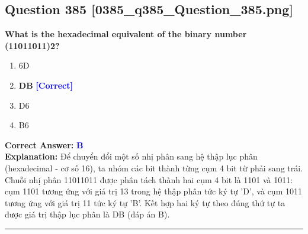 \documentclass[11pt,a4paper]{article}
\begin{document}
\begin{minipage}{\textwidth}
\subsection*{Question 385 \quad \footnotesize{[0385\_q385\_Question\_385.png]}}
\noindent \textbf{What is the hexadecimal equivalent of the binary number (11011011)2?}

\begin{enumerate}[label=\Alph*.]
    \item 6D
    \item \textbf{DB} \hfill \textcolor{blue}{\textbf{[Correct]}}
    \item D6
    \item B6
\end{enumerate}

\noindent \textbf{Correct Answer:} \textcolor{blue}{\textbf{B}} \\[2pt]
\noindent \textbf{Explanation:} Để chuyển đổi một số nhị phân sang hệ thập lục phân (hexadecimal - cơ số 16), ta nhóm các bit thành từng cụm 4 bit từ phải sang trái. Chuỗi nhị phân 11011011 được phân tách thành hai cụm 4 bit là 1101 và 1011: cụm 1101 tương ứng với giá trị 13 trong hệ thập phân tức ký tự 'D', và cụm 1011 tương ứng với giá trị 11 tức ký tự 'B'. Kết hợp hai ký tự theo đúng thứ tự ta được giá trị thập lục phân là DB (đáp án B).

\par\vspace{0.3cm}
\hrule
\vspace{0.3cm}
\end{minipage}
\end{document}
